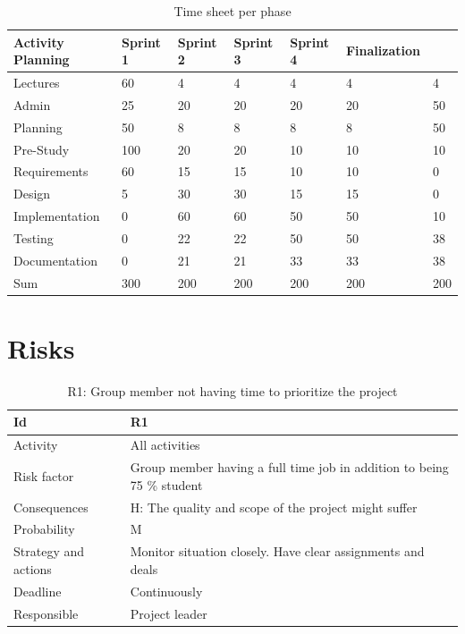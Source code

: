 \documentclass[11pt]{book}
\begin{document}
\begin{table}[H]
\centering
\begin{tabular}{ l | l l l l l l }
	Activity		Planning 	& Sprint 1 	& Sprint 2 	& Sprint 3 	& Sprint 4 	& Finalization	\\ \hline		
	Lectures		& 60 		& 4 		& 4 		& 4 		& 4 		& 4				\\ \hline
	Admin			& 25 		& 20 		& 20 		& 20 		& 20 		& 50			\\ \hline
	Planning		& 50 		& 8 		& 8 		& 8 		& 8 		& 50			\\ \hline
	Pre-Study		& 100 		& 20 		& 20 		& 10 		& 10 		& 10			\\ \hline
	Requirements	& 60 		& 15 		& 15 		& 10 		& 10 		& 0				\\ \hline
	Design			& 5 		& 30 		& 30 		& 15 		& 15 		& 0				\\ \hline
	Implementation	& 0 		& 60 		& 60 		& 50 		& 50 		& 10			\\ \hline
	Testing			& 0 		& 22 		& 22 		& 50 		& 50 		& 38			\\ \hline
	Documentation	& 0 		& 21 		& 21 		& 33 		& 33 		& 38			\\ \hline
	Sum				& 300 		& 200 		& 200 		& 200 		& 200 		& 200
\end{tabular}
\label{tab:plan_time_per_phase}
\caption{Time sheet per phase}
\end{table}

\section{Risks}\label{sec:project_risk_assessment}

\begin{table}[H]
\centering
\begin{tabular}{ l  p{11cm} }
	Id						& R1 																		\\ \hline
	Activity				& All activities																\\ \hline
	Risk factor				& Group member having a full time job in addition to being 75 \% student 	\\ \hline
	Consequences			& H: The quality and scope of the project might suffer 						\\ \hline
	Probability				& M 																		\\ \hline
	Strategy and actions	& Monitor situation closely. Have clear assignments and deals 				\\ \hline
	Deadline				& Continuously 																\\ \hline
	Responsible				& Project leader 															\\ 
\end{tabular}
\label{tab:risk_1}
\caption{R1: Group member not having time to prioritize the project}
\end{table}
\end{document}
